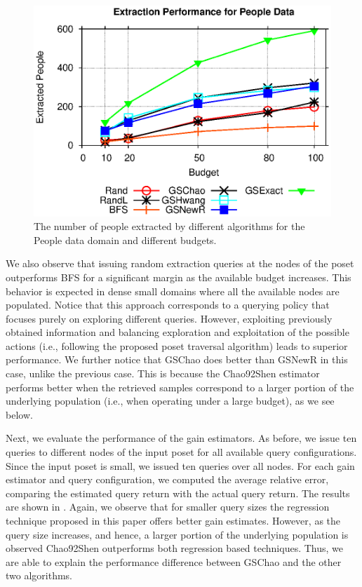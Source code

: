 \begin{figure}[h]
	\vspace{-10pt}
	\begin{center}
	\includegraphics[clip,scale=0.5]{figs/poExtraction.eps}
	\caption{The number of people extracted by different algorithms for the People data domain and different budgets.}
	\label{fig:poextraction}
	\end{center}
	\vspace{-15pt}
\end{figure}

We also observe that issuing random extraction queries at the nodes of the poset outperforms BFS for a significant margin as the available budget increases. This behavior is expected in dense small domains where all the available nodes are populated. Notice that this approach corresponds to a querying policy that focuses purely on exploring different queries. However, exploiting previously obtained information and balancing exploration and exploitation of the possible actions (i.e., following the proposed poset traversal algorithm) leads to superior performance. We further notice that GSChao does better than GSNewR in this case, unlike the previous case. This is because the Chao92Shen estimator performs better when the retrieved samples correspond to a larger portion of the underlying population (i.e., when operating under a large budget), as we see below. 

Next, we evaluate the performance of the gain estimators. As before, we issue ten queries to different nodes of the input poset for all available query configurations. Since the input poset is small, we issued ten queries over all nodes. For each gain estimator and query configuration, we computed the average relative error, comparing the estimated query return with the actual query return. The results are shown in . Again, we observe that for smaller query sizes the regression technique proposed in this paper offers better gain estimates. However, as the query size increases, and hence, a larger portion of the underlying population is observed Chao92Shen outperforms both regression based techniques. Thus, we are able to explain the performance difference between GSChao and the other two algorithms.

